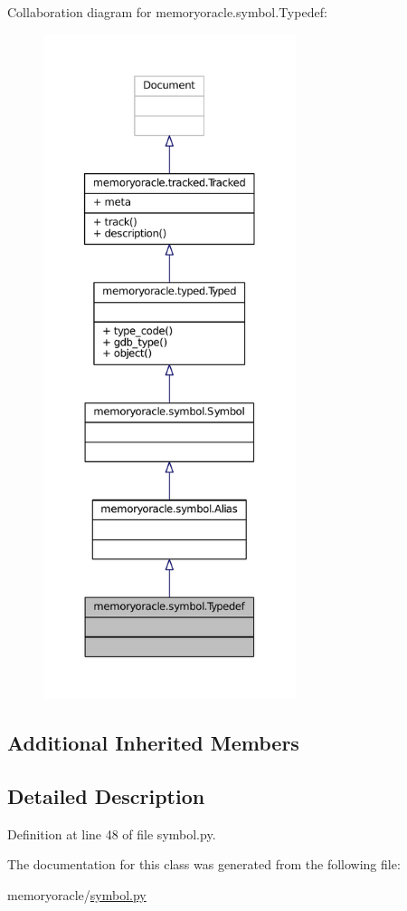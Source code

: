 Collaboration diagram for memoryoracle.\+symbol.\+Typedef\+:
\nopagebreak
\begin{figure}[H]
\begin{center}
\leavevmode
\includegraphics[height=550pt]{classmemoryoracle_1_1symbol_1_1Typedef__coll__graph}
\end{center}
\end{figure}
\subsection*{Additional Inherited Members}


\subsection{Detailed Description}


Definition at line 48 of file symbol.\+py.



The documentation for this class was generated from the following file\+:\begin{DoxyCompactItemize}
\item 
memoryoracle/\hyperlink{symbol_8py}{symbol.\+py}\end{DoxyCompactItemize}
